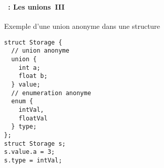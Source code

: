 \begin{frame}[containsverbatim]
  \frametitle{\secname}
  \framesubtitle{\subsecname~: Les unions~III}

  {\small\begin{exampleblock}{Exemple d'une union anonyme dans une structure}
    \begin{verbatim}
struct Storage {
  // union anonyme
  union {
    int a;
    float b;
  } value;
  // enumeration anonyme
  enum { 
    intVal, 
    floatVal 
  } type;
};
struct Storage s;
s.value.a = 3;
s.type = intVal;\end{verbatim}
  \end{exampleblock}}
\end{frame}
